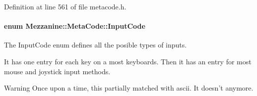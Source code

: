 Definition at line 561 of file metacode.h.

\hypertarget{classMezzanine_1_1MetaCode_a3b5633f0145bf3287cf53a3f05b5563c}{
\paragraph[{InputCode}]{\setlength{\rightskip}{0pt plus 5cm}enum {\bf Mezzanine::MetaCode::InputCode}}\hfill}
\label{classMezzanine_1_1MetaCode_a3b5633f0145bf3287cf53a3f05b5563c}


The InputCode enum defines all the posible types of inputs. 

It has one entry for each key on a most keyboards. Then it has an entry for most mouse and joystick input methods. \begin{DoxyWarning}{Warning}
Once upon a time, this partially matched with ascii. It doesn't anymore. 
\end{DoxyWarning}
